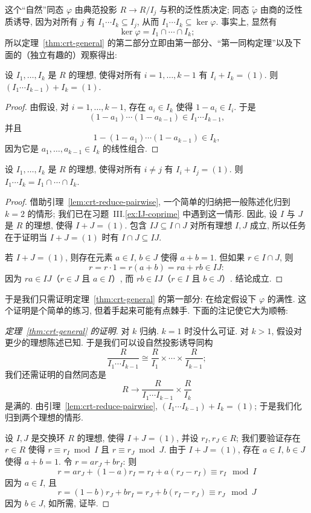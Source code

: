 这个``自然''同态 $\varphi$ 由典范投影 $R\to R/I_j$ 与积的泛性质决定; 同态 $\tilde{\varphi}$ 由商的泛性质诱导, 因为对所有 $j$ 有 $I_1\cdots I_k\subseteq I_j$, 从而 $I_1\cdots I_k\subseteq\ker\varphi$. 事实上, 显然有
\[
\ker\varphi=I_1\cap\cdots\cap I_k;
\]
所以定理~\ref{thm:crt-general} 的第二部分立即由第一部分、``第一同构定理''以及下面的（独立有趣的）观察得出:

\begin{lemma}\label{lem:crt-reduce-pairwise}
设 $I_1,\ldots,I_k$ 是 $R$ 的理想, 使得对所有 $i=1,\ldots,k-1$ 有 $I_i+I_k=(1)$. 则 $(I_1\cdots I_{k-1})+I_k=(1)$.
\end{lemma}

\begin{proof}
由假设, 对 $i=1,\ldots,k-1$, 存在 $a_i\in I_k$ 使得 $1-a_i\in I_i$. 于是
\[
(1-a_1)\cdots(1-a_{k-1})\in I_1\cdots I_{k-1},
\]
并且
\[
1-(1-a_1)\cdots(1-a_{k-1})\in I_k,
\]
因为它是 $a_1,\ldots,a_{k-1}\in I_k$ 的线性组合.
\end{proof}

\begin{lemma}\label{lem:coprime-product-intersection}
设 $I_1,\ldots,I_k$ 是 $R$ 的理想, 使得对所有 $i\neq j$ 有 $I_i+I_j=(1)$. 则 $I_1\cdots I_k=I_1\cap\cdots\cap I_k$.
\end{lemma}

\begin{proof}
借助引理~\ref{lem:crt-reduce-pairwise}, 一个简单的归纳把一般陈述化归到 $k=2$ 的情形; 我们已在习题~III.\ref{ex:IJ-coprime} 中遇到这一情形. 因此, 设 $I$ 与 $J$ 是 $R$ 的理想, 使得 $I+J=(1)$. 包含 $IJ\subseteq I\cap J$ 对所有理想 $I,J$ 成立, 所以任务在于证明当 $I+J=(1)$ 时有 $I\cap J\subseteq IJ$.

若 $I+J=(1)$, 则存在元素 $a\in I$, $b\in J$ 使得 $a+b=1$. 但如果 $r\in I\cap J$, 则
\[
r=r\cdot 1=r(a+b)=ra+rb\in IJ:
\]
因为 $ra\in IJ$（$r\in J$ 且 $a\in I$）, 而 $rb\in IJ$（$r\in I$ 且 $b\in J$）. 结论成立.
\end{proof}

于是我们只需证明定理~\ref{thm:crt-general} 的第一部分: 在给定假设下 $\varphi$ 的满性. 这个证明是个简单的练习, 但着手起来可能有点棘手. 下面的注记使它大为顺畅:



\begin{proof}[定理~\ref{thm:crt-general} 的证明]
对 $k$ 归纳. $k=1$ 时没什么可证. 对 $k>1$, 假设对更少的理想陈述已知. 于是我们可以设自然投影诱导同构
\[
\frac{R}{I_1\cdots I_{k-1}}\cong\frac{R}{I_1}\times\cdots\times\frac{R}{I_{k-1}};
\]
我们还需证明的自然同态是
\[
R\to\frac{R}{I_1\cdots I_{k-1}}\times\frac{R}{I_k}
\]
是满的. 由引理~\ref{lem:crt-reduce-pairwise}, $(I_1\cdots I_{k-1})+I_k=(1)$; 于是我们化归到两个理想的情形.

设 $I,J$ 是交换环 $R$ 的理想, 使得 $I+J=(1)$, 并设 $r_I,r_J\in R$; 我们要验证存在 $r\in R$ 使得 $r\equiv r_I\bmod I$ 且 $r\equiv r_J\bmod J$. 由于 $I+J=(1)$, 存在 $a\in I$, $b\in J$ 使得 $a+b=1$. 令 $r=ar_J+br_I$: 则
\[
r=ar_J+(1-a)r_I=r_I+a(r_J-r_I)\equiv r_I\mod I
\]
因为 $a\in I$, 且
\[
r=(1-b)r_J+br_I=r_J+b(r_I-r_J)\equiv r_J\mod J
\]
因为 $b\in J$, 如所需, 证毕.
\end{proof}

